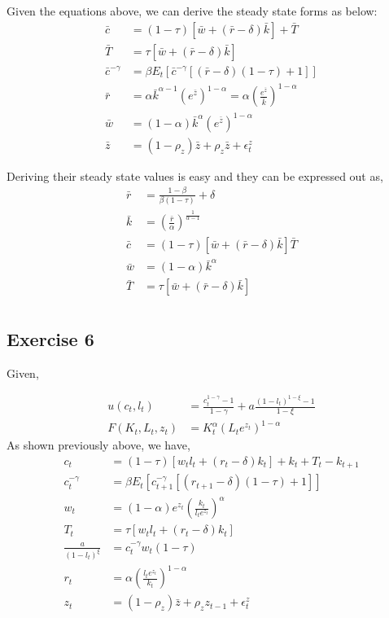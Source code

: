 \documentclass[12pt]{article}
\begin{document}
Given the equations above, we can derive the steady state forms as below:
\begin{align}
\bar{c} &= (1 - \tau)[\bar{w}+ (\bar{r} - \delta) \bar{k}]  + \bar{T}  \\
\bar{T} &= \tau [\bar{w} + (\bar{r}- \delta)\bar{k} ] \\
\bar{c} ^{-\gamma} &= \beta E_t \left[ \bar{c}^{-\gamma} [(\bar{r} - \delta)(1 - \tau) + 1] \right] \\
\bar{r} &= \alpha \bar{k} ^{\alpha - 1} (e^{\bar{z}})^{1 - \alpha} = \alpha \left(\frac{e^{\bar{z}}}{\bar{k}} \right)^{1 - \alpha} \\
\bar{w} &= (1 - \alpha) \bar{k} ^{\alpha} (e^{\bar{z}})^{1 - \alpha} \\
\bar{z} &= (1 - \rho_z)\bar{z} + \rho_z \bar{z} + \epsilon^z_t
\end{align}

Deriving their steady state values is easy and they can be expressed out as,
\begin{align}
\bar{r} &= \frac{1 - \beta}{\beta (1 - \tau)} + \delta \\
\bar{k} &= \left(  \frac{\bar{r}}{\alpha}\right)^{\frac{1}{\alpha - 1}} \\
\bar{c} &= (1 - \tau)[\bar{w}+ (\bar{r} - \delta) \bar{k}]  \bar{T}  \\
\bar{w} &= (1 - \alpha) \bar{k} ^{\alpha} \\
\bar{T} &= \tau [\bar{w} + (\bar{r}- \delta)\bar{k} ] \\
\end{align}

\subsection*{Exercise 6}
Given,

\begin{align*}
u(c_t, l_t) &= \frac{c_t^{1-\gamma} - 1}{1- \gamma} + a \frac{(1 - l_t)^{1 - \xi}-1}{1 - \xi} \\
F(K_t, L_t, z_t) &= K_t^{\alpha} (L_t e^{z_t})^{1 - \alpha}
\end{align*}
As shown previously above, we have,
\begin{align}
c_t &= (1 - \tau)[w_tl_t + (r_t -\delta)k_t] + k_t + T_t - k_{t+1} \\
c_t ^{-\gamma} &= \beta E_t\left[ c_{t+1}^{-\gamma} [(r_{t+1} - \delta)(1 - \tau) + 1]\right] \\
w_t &= (1 - \alpha) e^{z_t} \left( \frac{k_t}{l_t e^{z_t}} \right)^{\alpha} \\
T_t &= \tau[w_tl_t + (r_t - \delta)k_t] \\
\frac{a}{(1-l_t)^{\xi}} &= c_t ^{-\gamma} w_t (1-\tau) \\
r_t &= \alpha \left( \frac{l_t e^{z_t}}{k_t} \right)^{1 - \alpha} \\
z_t &= (1-\rho_z)\bar{z} + \rho_z z_{t-1} + \epsilon^z_t
\end{align}
\end{document}
